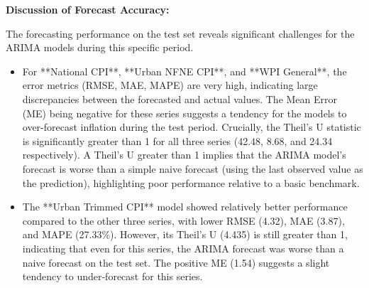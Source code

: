 \documentclass[12pt,a4paper]{article}
\begin{document}

\textbf{Discussion of Forecast Accuracy:}

The forecasting performance on the test set reveals significant challenges for the ARIMA models during this specific period.

\begin{itemize}
    \item For **National CPI**, **Urban NFNE CPI**, and **WPI General**, the error metrics (RMSE, MAE, MAPE) are very high, indicating large discrepancies between the forecasted and actual values. The Mean Error (ME) being negative for these series suggests a tendency for the models to over-forecast inflation during the test period. Crucially, the Theil's U statistic is significantly greater than 1 for all three series (42.48, 8.68, and 24.34 respectively). A Theil's U greater than 1 implies that the ARIMA model's forecast is worse than a simple naive forecast (using the last observed value as the prediction), highlighting poor performance relative to a basic benchmark.
    \item The **Urban Trimmed CPI** model showed relatively better performance compared to the other three series, with lower RMSE (4.32), MAE (3.87), and MAPE (27.33\%). However, its Theil's U (4.435) is still greater than 1, indicating that even for this series, the ARIMA forecast was worse than a naive forecast on the test set. The positive ME (1.54) suggests a slight tendency to under-forecast for this series.
\end{itemize}
\end{document}
